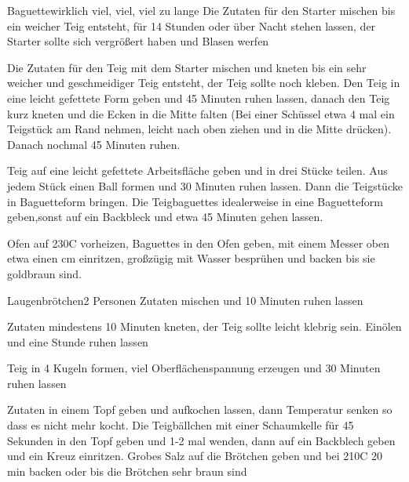 

\begin{recipe}{Baguette}{}{wirklich viel, viel, viel zu lange}
Die Zutaten für den Starter mischen bis ein weicher Teig entsteht, für 14 Stunden oder über Nacht stehen lassen, der Starter sollte sich vergrößert haben und Blasen werfen

Die Zutaten für den Teig mit dem Starter mischen und kneten bis ein sehr weicher und geschmeidiger Teig entsteht, der Teig sollte noch kleben.
Den Teig in eine leicht gefettete Form geben und 45 Minuten ruhen lassen, danach den Teig kurz kneten und die Ecken in die Mitte falten (Bei einer Schüssel etwa 4 mal ein Teigstück am Rand nehmen, leicht nach oben ziehen und in die Mitte drücken). Danach nochmal 45 Minuten ruhen.

\ing[]{}{}
Teig auf eine leicht gefettete Arbeitsfläche geben und in drei Stücke teilen. Aus jedem Stück einen Ball formen und 30 Minuten ruhen lassen. Dann die Teigstücke in Baguetteform bringen.
Die Teigbaguettes idealerweise in eine Baguetteform geben,sonst auf ein Backbleck und etwa 45 Minuten gehen lassen. 

\ing[]{}{}
Ofen auf 230\0C vorheizen, Baguettes in den Ofen geben, mit einem Messer oben etwa einen cm einritzen, großzügig mit Wasser besprühen und backen bis sie goldbraun sind.
\end{recipe}


\begin{recipe}{Laugenbrötchen}{}{2 Personen}
Zutaten mischen und 10 Minuten ruhen lassen

Zutaten mindestens 10 Minuten kneten, der Teig sollte leicht klebrig sein.
Einölen und eine Stunde ruhen lassen

\ing[]{}{}
Teig in 4 Kugeln formen, viel Oberflächenspannung erzeugen und 30 Minuten ruhen lassen

Zutaten in einem Topf geben und aufkochen lassen, dann Temperatur senken so dass es nicht mehr kocht. Die Teigbällchen mit einer Schaumkelle für 45 Sekunden in den Topf geben und 1-2 mal wenden, dann auf ein Backblech geben und ein Kreuz einritzen.
Grobes Salz auf die Brötchen geben und bei 210\0C 20 min backen oder bis die Brötchen sehr braun sind 
\end{recipe}

